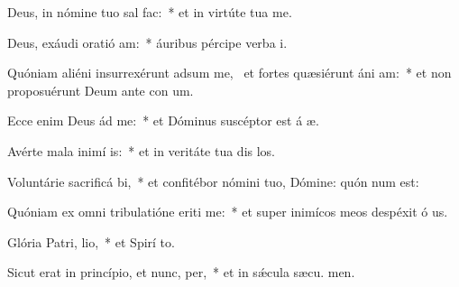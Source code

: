 \item Deus, in nómine tuo sal  fac:~* et in virtúte tua  me.
\item Deus, exáudi oratió am:~* áuribus pércipe verba  i.
\item Quóniam aliéni insurrexérunt adsum me,~\pscross{} et fortes quæsiérunt áni am:~* et non proposuérunt Deum ante con um.
\item Ecce enim Deus ád me:~* et Dóminus suscéptor est á æ.
\item Avérte mala inimí is:~* et in veritáte tua dis los.
\item Voluntárie sacrificá bi,~* et confitébor nómini tuo, Dómine: quón num est:
\item Quóniam ex omni tribulatióne eriti me:~* et super inimícos meos despéxit ó us.
\item Glória Patri,  lio,~* et Spirí to.
\item Sicut erat in princípio, et nunc,  per,~* et in sǽcula sæcu. men.
